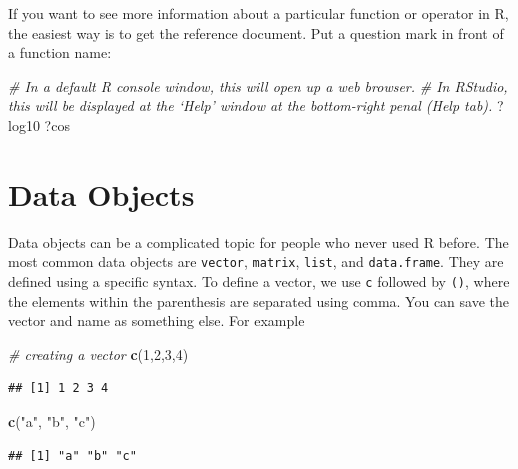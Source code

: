 \documentclass[
]{book}
\newenvironment{Shaded}{\begin{snugshade}}{\end{snugshade}}
\newcommand{\CommentTok}[1]{\textcolor[rgb]{0.56,0.35,0.01}{\textit{#1}}}
\newcommand{\DecValTok}[1]{\textcolor[rgb]{0.00,0.00,0.81}{#1}}
\newcommand{\KeywordTok}[1]{\textcolor[rgb]{0.13,0.29,0.53}{\textbf{#1}}}
\newcommand{\NormalTok}[1]{#1}
\newcommand{\StringTok}[1]{\textcolor[rgb]{0.31,0.60,0.02}{#1}}
\begin{document}
If you want to see more information about a particular function or operator in R, the easiest way is to get the reference document. Put a question mark in front of a function name:

\begin{Shaded}
\begin{Highlighting}[]
  \CommentTok{# In a default R console window, this will open up a web browser.}
  \CommentTok{# In RStudio, this will be displayed at the ‘Help’ window at the bottom-right penal (Help tab). }
\NormalTok{  ?log10}
\NormalTok{  ?cos}
\end{Highlighting}
\end{Shaded}

\hypertarget{data-objects}{%
\section{Data Objects}\label{data-objects}}

Data objects can be a complicated topic for people who never used R before. The most common data objects are \texttt{vector}, \texttt{matrix}, \texttt{list}, and \texttt{data.frame}. They are defined using a specific syntax. To define a vector, we use \texttt{c} followed by \texttt{()}, where the elements within the parenthesis are separated using comma. You can save the vector and name as something else. For example

\begin{Shaded}
\begin{Highlighting}[]
  \CommentTok{# creating a vector}
  \KeywordTok{c}\NormalTok{(}\DecValTok{1}\NormalTok{,}\DecValTok{2}\NormalTok{,}\DecValTok{3}\NormalTok{,}\DecValTok{4}\NormalTok{)}
\end{Highlighting}
\end{Shaded}

\begin{verbatim}
## [1] 1 2 3 4
\end{verbatim}

\begin{Shaded}
\begin{Highlighting}[]
  \KeywordTok{c}\NormalTok{(}\StringTok{"a"}\NormalTok{, }\StringTok{"b"}\NormalTok{, }\StringTok{"c"}\NormalTok{)}
\end{Highlighting}
\end{Shaded}

\begin{verbatim}
## [1] "a" "b" "c"
\end{verbatim}
\end{document}
